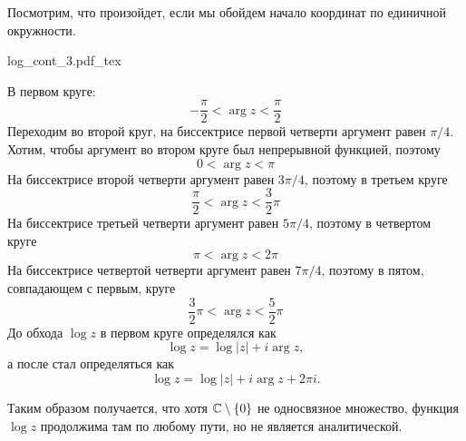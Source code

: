 \documentclass[main]{subfiles}
\begin{document}
\begin{example}
    Посмотрим, что произойдет, если мы обойдем начало координат по единичной окружности.
    \begin{center}
        {log_cont_3.pdf_tex}
    \end{center}
    В первом круге:
    \[- \frac{\pi}{2} < \arg z < \frac{\pi}{2}\]
    Переходим во второй круг, на биссектрисе первой четверти аргумент равен $\pi /4$.
    Хотим, чтобы аргумент во втором круге был непрерывной функцией, поэтому
    \[0 < \arg z < \pi\]
    На биссектрисе второй четверти аргумент равен $3 \pi/4$, поэтому в третьем круге
    \[ \frac{\pi}{2} < \arg z < \frac{3}{2} \pi\]
    На биссектрисе третьей четверти аргумент равен $5 \pi/4$, поэтому в четвертом круге
    \[\pi < \arg z < 2 \pi\]
    На биссектрисе  четвертой четверти аргумент равен $7 \pi/4$, поэтому в пятом, совпадающем с первым, круге
    \[ \frac{3}{2}\pi < \arg z < \frac{5}{2} \pi\]
    До обхода $\log z$ в первом круге определялся как
    \[\log z = \log |z| + i \arg z,\]
    а после стал определяться как
    \[\log z = \log |z| + i \arg z + 2 \pi i.\]

    Таким образом получается, что хотя $\mathbb{C} \setminus \{0\}$ не односвязное множество, функция $\log z$ продолжима там по любому пути, но не является аналитической.
\end{example}
\end{document}
